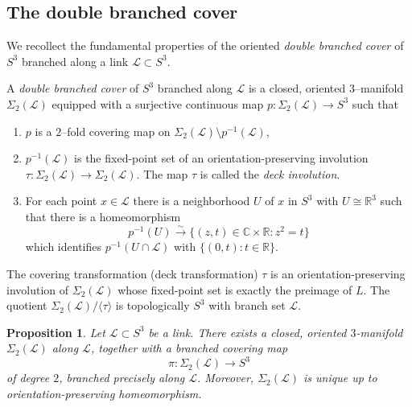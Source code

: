 \documentclass[table]{amsart}
\newtheorem{proposition}[theorem]{Proposition}
\newcommand{\cL}{\mathcal{L}}
\newcommand{\cover}{\Sigma_2}
\numberwithin{equation}{section}
\begin{document}
\subsection{The double branched cover}
We recollect the fundamental properties of the oriented \emph{double branched cover} of \(S^3\) branched along a link \(\cL\subset S^3\). 




A \emph{double branched cover} of \(S^3\) branched along \(\cL\) is a closed, oriented $3$--manifold $\cover(\cL)$ equipped with a surjective continuous map $p\colon \cover(\cL) \to S^3$ such that
\begin{enumerate}%
  \item \(p\) is a $2$--fold covering map on \(\cover(\cL)\setminus p^{-1}(\cL)\),
  \item \(p^{-1}(\cL)\) is the fixed-point set of an orientation-preserving involution \(\tau\colon \cover(\cL)\to \cover(\cL)\). The map $\tau$ is called the \emph{deck involution}.
  \item For each point \(x\in \cL\) there is a neighborhood \(U\) of \(x\) in \(S^3\) with \(U\cong \mathbb{R}^3\) such that there is a homeomorphism \[p^{-1}(U)\xrightarrow{\sim} \{(z,t)\in\mathbb{C}\times\mathbb{R} : z^2=t\}\] which identifies $p^{-1}(U\cap \cL)$ with $\{(0,t):t\in \mathbb{R}\}$.
\end{enumerate}

\par The covering transformation (deck transformation) \(\tau\) is an orientation-preserving involution of \(\cover(\cL)\) whose fixed-point set is exactly the preimage of \(L\). The quotient \(\cover(\cL)/\langle \tau\rangle\) is topologically \(S^3\) with branch set \(\cL\).

\begin{proposition}
Let $\cL \subset S^3$ be a link. There exists a closed, oriented $3$-manifold $\Sigma_2(\cL)$ along $\cL$, together with a branched covering map 
\[
\pi:\Sigma_2(\cL) \longrightarrow S^3
\] 
of degree $2$, branched precisely along $\cL$. Moreover, $\Sigma_2(\cL)$ is unique up to orientation-preserving homeomorphism.
\end{proposition}
\end{document}
